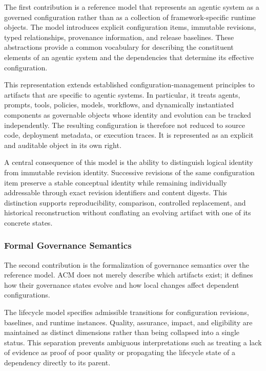 \documentclass[10pt]{article}
\begin{document}
The first contribution is a reference model that represents an agentic system as a governed configuration rather than as a collection of framework-specific runtime objects. The model introduces explicit configuration items, immutable revisions, typed relationships, provenance information, and release baselines. These abstractions provide a common vocabulary for describing the constituent elements of an agentic system and the dependencies that determine its effective configuration.

This representation extends established configuration-management principles to artifacts that are specific to agentic systems. In particular, it treats agents, prompts, tools, policies, models, workflows, and dynamically instantiated components as governable objects whose identity and evolution can be tracked independently. The resulting configuration is therefore not reduced to source code, deployment metadata, or execution traces. It is represented as an explicit and auditable object in its own right.

A central consequence of this model is the ability to distinguish logical identity from immutable revision identity. Successive revisions of the same configuration item preserve a stable conceptual identity while remaining individually addressable through exact revision identifiers and content digests. This distinction supports reproducibility, comparison, controlled replacement, and historical reconstruction without conflating an evolving artifact with one of its concrete states.

\subsubsection{Formal Governance Semantics}

The second contribution is the formalization of governance semantics over the reference model. ACM does not merely describe which artifacts exist; it defines how their governance states evolve and how local changes affect dependent configurations.

The lifecycle model specifies admissible transitions for configuration revisions, baselines, and runtime instances. Quality, assurance, impact, and eligibility are maintained as distinct dimensions rather than being collapsed into a single status. This separation prevents ambiguous interpretations such as treating a lack of evidence as proof of poor quality or propagating the lifecycle state of a dependency directly to its parent.
\end{document}
